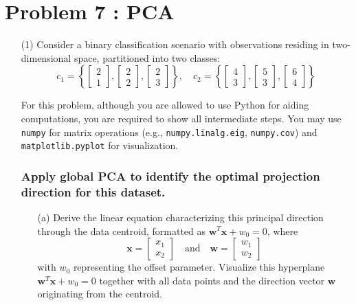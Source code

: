 \documentclass[11pt,addpoints,answers]{exam}
\begin{document}
	\section*{Problem 7 : PCA}
	
	\begin{enumerate}
		\item[(1)] Consider a binary classification scenario with observations residing in two-dimensional space, partitioned into two classes:  
		\[
		c_{1}=\left\{ \begin{bmatrix} 2 \\ 1 \end{bmatrix}, \begin{bmatrix} 2 \\ 2 \end{bmatrix}, \begin{bmatrix} 2 \\ 3 \end{bmatrix} \right\}, \quad c_{2}=\left\{ \begin{bmatrix} 4 \\ 3 \end{bmatrix}, \begin{bmatrix} 5 \\ 3 \end{bmatrix}, \begin{bmatrix} 6 \\ 4 \end{bmatrix} \right\}
		\]
		
		For this problem, although you are allowed to use Python for aiding computations, you are required to show all intermediate steps. You may use \texttt{numpy} for matrix operations (e.g., \texttt{numpy.linalg.eig}, \texttt{numpy.cov}) and \texttt{matplotlib.pyplot} for visualization.
		
		
		\subsubsection*{Apply global PCA to identify the optimal projection direction for this dataset.}
		\begin{enumerate}
			\item[(a)] Derive the linear equation characterizing this principal direction through the data centroid, formatted as $\mathbf{w}^{T} \mathbf{x} + w_{0} = 0$, where 
			\[
			\mathbf{x} = \begin{bmatrix} x_{1} \\ x_{2} \end{bmatrix} \quad \text{and} \quad \mathbf{w} = \begin{bmatrix} w_{1} \\ w_{2} \end{bmatrix}
			\]
			with $w_{0}$ representing the offset parameter. Visualize this hyperplane $\mathbf{w}^{T} \mathbf{x} + w_{0} = 0$ together with all data points and the direction vector $\mathbf{w}$ originating from the centroid.


\end{enumerate}
\end{enumerate}
\end{document}
